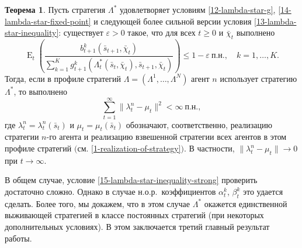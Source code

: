 \documentclass[a4paper,12pt,russian]{article} %
\theoremstyle{definition}
\newtheorem{theorem}{Теорема}
\DeclareMathOperator{\E}{E}
\renewcommand{\epsilon}{\varepsilon}
\begin{document}
\begin{theorem}
\label{theorem2-convergence}
Пусть стратегия $\Lambda^*$ удовлетворяет условиям \eqref{12-lambda-star-g}, \eqref{14-lambda-star-fixed-point} и следующей более сильной версии условия \eqref{13-lambda-star-inequality}: существует $\epsilon>0$ такое, что для всех $t\ge 0$ и  $\bar \chi_t$ выполнено
\begin{equation}
\label{15-lambda-star-inequality-strong}
\E_t\left( 
  \frac{b_{t+1}^k (\bar s_{t+1},\bar\chi_t)}
       {\sum_{k=1}^K g_{t+1}^k(\Lambda^*_t(\bar s_{t},\bar\chi_t), \bar s_{t+1},\bar\chi_t)}
  \right) \le 1-\epsilon\ \text{п.н.}, \quad k=1,\dots,K.
\end{equation}
Тогда, если в профиле стратегий $\Lambda=(\Lambda^1,\dots,\Lambda^N)$ агент $n$ использует стратегию $\Lambda^*$, то выполнено
\[
\sum_{t=1}^\infty \|\lambda_t^n - \mu_t\|^2 < \infty\ \text{п.н.},
\]
где $\lambda_t^n = \lambda_t^n(\bar s_t)$ и $\mu_t=\mu_t(\bar s_t)$ обозначают, соответственно, реализацию стратегии $n$-го агента и реализацию взвешенной стратегии всех агентов в этом профиле стратегий  $($см. \eqref{1-realization-of-strategy}$)$.
В частности, $\|\lambda_t^n - \mu_t\| \to 0$ при $t\to\infty$.
\end{theorem}

В общем случае, условие \eqref{15-lambda-star-inequality-strong} проверить достаточно сложно.
Однако в случае н.о.р.\ коэффициентов $\alpha_{t}^k$, $\beta_{t}^k$ это удается сделать. Более того, мы докажем, что в этом случае $\Lambda^*$ окажется единственной выживающей стратегией в классе постоянных стратегий (при некоторых дополнительных условиях).
В этом заключается третий главный результат работы.
\end{document}
